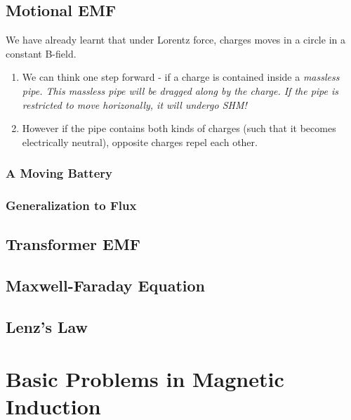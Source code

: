 \documentclass[class=article, crop=false, 12pt]{standalone}
\begin{document}
\subsection{Motional EMF}

We have already learnt that under Lorentz force, 
charges moves in a circle in a constant B-field.

\begin{enumerate}
    \item We can think one step forward -
    if a charge is contained inside a \it{massless} pipe.
    This massless pipe will be dragged along by the charge.
    If the pipe is restricted to move horizonally,
    it will undergo SHM!


    
    \item However if the pipe contains both kinds of charges
    (such that it becomes electrically neutral),
    opposite charges repel each other.
    


\end{enumerate}

\subsubsection{A Moving Battery}

\subsubsection{Generalization to Flux}

\subsection{Transformer EMF}

\subsection{Maxwell-Faraday Equation}

\subsection{Lenz's Law}


\linesep
\section{Basic Problems in Magnetic Induction}


\theend
\end{document}
